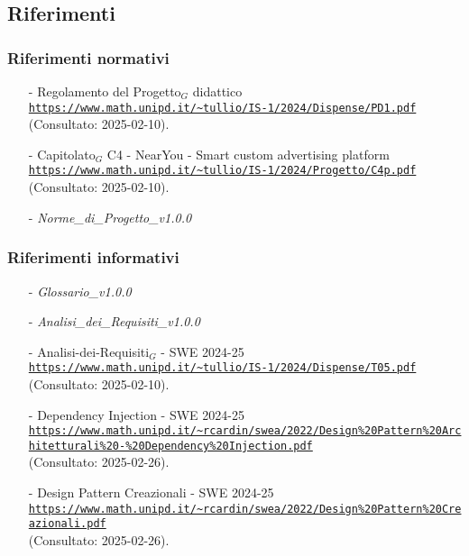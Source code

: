 \documentclass[10pt]{article}
\begin{document}
\begin{justify}
\subsection{Riferimenti}
\subsubsection{Riferimenti normativi}
\begin{itemize}
    \item[-] Regolamento del Progetto$_G$ didattico  \\
    \textcolor{blue}{\texttt{\url{https://www.math.unipd.it/~tullio/IS-1/2024/Dispense/PD1.pdf}}}\\ (Consultato: 2025-02-10).
    \item[-] Capitolato$_G$ C4 - NearYou - Smart custom advertising platform\\
    \textcolor{blue}{\texttt{\url{https://www.math.unipd.it/~tullio/IS-1/2024/Progetto/C4p.pdf}}}\\ (Consultato: 2025-02-10).
    \item[-] \textit{Norme\_di\_Progetto\_v1.0.0}
\end{itemize}

\subsubsection{Riferimenti informativi}
\begin{itemize}
    \item[-] \textit{Glossario\_v1.0.0}
    \item[-] \textit{Analisi\_dei\_Requisiti\_v1.0.0}
    \item[-] Analisi-dei-Requisiti$_G$ - SWE 2024-25\\
    \textcolor{blue}{\texttt{\url{https://www.math.unipd.it/\~tullio/IS-1/2024/Dispense/T05.pdf}}}\\ (Consultato: 2025-02-10).
    
    \item[-] Dependency Injection - SWE 2024-25\\    
    \textcolor{blue}{\texttt{\url{https://www.math.unipd.it/\~rcardin/swea/2022/Design\%20Pattern\%20Architetturali\%20-\%20Dependency\%20Injection.pdf}}}\\ (Consultato: 2025-02-26).
    
    \item[-] Design Pattern Creazionali - SWE 2024-25\\
    \textcolor{blue}{\texttt{\url{https://www.math.unipd.it/\~rcardin/swea/2022/Design\%20Pattern\%20Creazionali.pdf}}}\\ (Consultato: 2025-02-26).
    

\end{itemize}
\end{justify}
\end{document}
